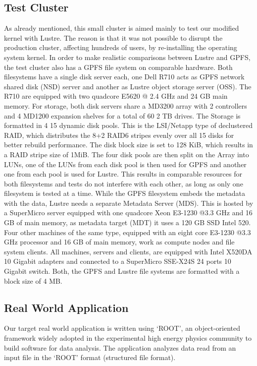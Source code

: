 \subsection{Test Cluster}
\label{subsec: test_cluster}
As already mentioned, this small cluster is aimed mainly to test our modified kernel with Lustre. The reason is that it was not possible to disrupt the production cluster, affecting hundreds of users, by re-installing the operating system kernel. In order to make realistic comparisons between Lustre and GPFS, the test cluster also has a GPFS file system on comparable hardware. Both filesystems have a single disk server each, one Dell R710 acts as GPFS network shared disk (NSD) server and another as Lustre object storage server (OSS). The R710 are equipped with two quadcore E5620 @ 2.4 GHz and 24 GB main memory. For storage, both disk servers share a MD3200 array with 2 controllers and 4 MD1200 expansion shelves for a total of 60 2 TB drives. The Storage is formatted in 4 15 dynamic disk pools. This is the LSI/Netapp type of declustered RAID, which distributes the 8+2 RAID6 stripes evenly over all 15 disks for better rebuild performance. The disk block size is set to 128 KiB, which results in a RAID stripe size of 1MiB. The four disk pools are then split on the Array into LUNs, one of the LUNs from each disk pool is then used for GPFS and another one from each pool is used for Lustre. This results in comparable resources for both filesystems and tests do not interfere with each other, as long as only one filesystem is tested at a time. While the GPFS filesystem embeds the metadata with the data, Lustre needs a separate Metadata Server (MDS). This is hosted by a SuperMicro server equipped with one quadcore Xeon E3-1230 @3.3 GHz and 16 GB of main memory, as metadata target (MDT) it uses a 120 GB SSD Intel 520. Four other machines of the same type, equipped with an eight core E3-1230 @3.3 GHz processor and 16 GB of main memory, work as compute nodes and file system clients. All machines, servers and clients, are equipped with Intel X520DA 10 Gigabit adapters and connected to a SuperMicro SSE-X24S 24 ports 10 Gigabit switch. Both, the GPFS and Lustre file systems are formatted with a block size of 4 MB.

\subsection{Real World Application}
\label{subsec: application}
Our target real world application is written using `ROOT', an object-oriented framework widely adopted in the experimental high energy physics community to build software for data analysis. The application analyzes data read from an input file in the `ROOT' format (structured file format). 

